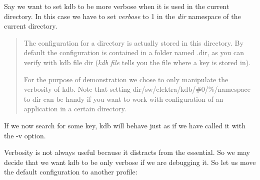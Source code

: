 Say we want to set {\ttfamily kdb} to be more verbose when it is used in the current directory. In this case we have to set {\itshape verbose} to 1 in the {\itshape dir} namespace of the current directory.


\begin{DoxyCode}{0}
\end{DoxyCode}


\begin{quote}
The configuration for a directory is actually stored in this directory. By default the configuration is contained in a folder named {\ttfamily .dir}, as you can verify with {\ttfamily kdb file dir} ({\itshape kdb file} tells you the file where a key is stored in).

For the purpose of demonstration we chose to only manipulate the verbosity of kdb. Note that setting {\ttfamily dir/sw/elektra/kdb/\#0/\%/namespace} to {\ttfamily dir} can be handy if you want to work with configuration of an application in a certain directory. \end{quote}


If we now search for some key, {\ttfamily kdb} will behave just as if we have called it with the {\ttfamily -\/v} option.


\begin{DoxyCode}{0}
\end{DoxyCode}


Verbosity is not always useful because it distracts from the essential. So we may decide that we want {\ttfamily kdb} to be only verbose if we are debugging it. So let us move the default configuration to another profile\+:


\begin{DoxyCode}{0}
\end{DoxyCode}


